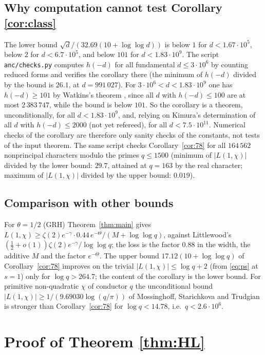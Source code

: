 \documentclass[11pt]{article}
\theoremstyle{definition}
\theoremstyle{remark}
\numberwithin{equation}{section}
\begin{document}
\subsection{Why computation cannot test Corollary \ref{cor:class}}
The lower bound $\sqrt d/(32.69(10+\log\log d))$ is below $1$ for $d<1.67\cdot10^5$, below $2$ for $d<6.7\cdot10^5$, and below $101$ for $d<1.83\cdot10^9$. The script \texttt{anc/checks.py} computes $h(-d)$ for all fundamental $d\le3\cdot10^6$ by counting reduced forms and verifies the corollary there (the minimum of $h(-d)$ divided by the bound is $26.1$, at $d=991\,027$). For $3\cdot10^6<d<1.83\cdot10^9$ one has $h(-d)\ge101$ by Watkins's theorem \cite{watkins2004}, since all $d$ with $h(-d)\le100$ are at most $2\,383\,747$, while the bound is below $101$. So the corollary is a theorem, unconditionally, for all $d<1.83\cdot10^9$, and, relying on Kimura's determination of all $d$ with $h(-d)\le2000$ \cite{kimura2026} (not yet refereed), for all $d<7.5\cdot10^{11}$. Numerical checks of the corollary are therefore only sanity checks of the constants, not tests of the input theorem. The same script checks Corollary~\ref{cor:78} for all $164\,562$ nonprincipal characters modulo the primes $q\le1500$ (minimum of $|L(1,\chi)|$ divided by the lower bound: $29.7$, attained at $q=163$ by the real character; maximum of $|L(1,\chi)|$ divided by the upper bound: $0.019$).

\subsection{Comparison with other bounds}
For $\theta=1/2$ (GRH) Theorem~\ref{thm:main} gives $L(1,\chi)\ge\zeta(2)e^{-\gamma}\cdot0.44\,e^{-\Theta}/(M+\log\log q)$, against Littlewood's $(\tfrac12+o(1))\zeta(2)e^{-\gamma}/\log\log q$; the loss is the factor $0.88$ in the width, the additive $M$ and the factor $e^{-\Theta}$. The upper bound $17.12(10+\log\log q)$ of Corollary~\ref{cor:78} improves on the trivial $|L(1,\chi)|\le\log q+2$ (from \eqref{eq:ps} at $s=1$) only for $\log q>264.7$; the content of the corollary is the lower bound. For primitive non-quadratic $\chi$ of conductor $q$ the unconditional bound $|L(1,\chi)|\ge1/(9.69030\log(q/\pi))$ of Mossinghoff, Starichkova and Trudgian \cite{mst2021} is stronger than Corollary~\ref{cor:78} for $\log q<14.78$, i.e.\ $q<2.6\cdot10^{6}$.

\section{Proof of Theorem \ref{thm:HL}}\label{sec:HL}
\end{document}
